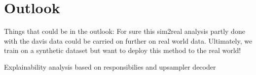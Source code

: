 \chapter{Outlook}\label{chapter:outlook}

Things that could be in the outlook:
For sure this sim2real analysis partly done with the davis data could be carried on further on real world data. Ultimately, we train on a synthetic dataset but want to deploy this method to the real world! 

Explainability analysis based on responsibilies and upsampler decoder 
